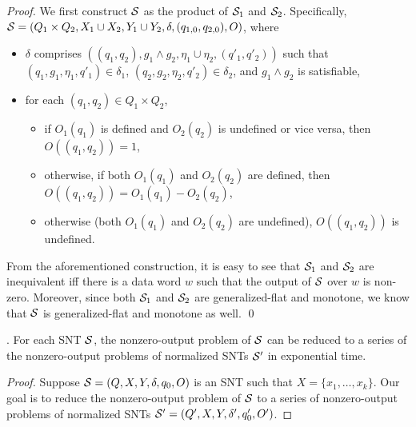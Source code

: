 \begin{appendix}
\begin{proof}
We first construct ${\mathcal{S} }$ as the product of ${\mathcal{S} }_1$ and ${\mathcal{S} }_2$. Specifically, ${\mathcal{S} }=(Q_1 \times Q_2, X_1 \cup X_2, Y_1 \cup Y_2, \delta, (q_{1,0},q_{2,0}), O)$, where
\begin{itemize}
\item $\delta$ comprises $((q_1,q_2), g_1 \wedge g_2, \eta_1 \cup \eta_2, (q'_1,q'_2))$ such that $(q_1,g_1,\eta_1,q'_1) \in \delta_1$, $(q_2,g_2,\eta_2,q'_2) \in \delta_2$, and $g_1 \wedge g_2$ is satisfiable,
%
\item for each $(q_1,q_2) \in Q_1 \times Q_2$, 
\begin{itemize}
\item if $O_1(q_1)$ is defined and $O_2(q_2)$ is undefined or vice versa, then $O((q_1,q_2))=1$, 
%
\item otherwise, if both $O_1(q_1)$ and $O_2(q_2)$ are defined, then $O((q_1,q_2))=O_1(q_1) - O_2(q_2)$, 
%
\item otherwise (both $O_1(q_1)$ and $O_2(q_2)$ are undefined), $O((q_1,q_2))$ is undefined. 
\end{itemize}
\end{itemize}
From the aforementioned construction, it is easy to see that ${\mathcal{S} }_1$ and ${\mathcal{S} }_2$ are  inequivalent iff there is a data word $w$ such that the output of ${\mathcal{S} }$ over $w$ is non-zero. Moreover, since both ${\mathcal{S} }_1$ and ${\mathcal{S} }_2$ are generalized-flat and monotone, we know that ${\mathcal{S} }$ is generalized-flat and monotone as well.   \qed
\end{proof}


.
{
For each SNT ${\mathcal{S} }$, the nonzero-output problem of ${\mathcal{S} }$ can be reduced to a series of the nonzero-output problems of normalized SNTs ${\mathcal{S} }'$ in exponential time.
}
\smallskip

\newcommand{\tpo}{\mathsf{TPO}}


\begin{proof}
Suppose ${\mathcal{S} } = (Q, X, Y, \delta, q_0, O)$ is an SNT such that $X=\{x_1,\dots, x_k\}$. Our goal is to reduce the nonzero-output problem of ${\mathcal{S} }$ to a series of  nonzero-output problems of normalized SNTs ${\mathcal{S} }'  = (Q', X, Y, \delta', q'_0, O')$.




\end{proof}
\end{appendix}
